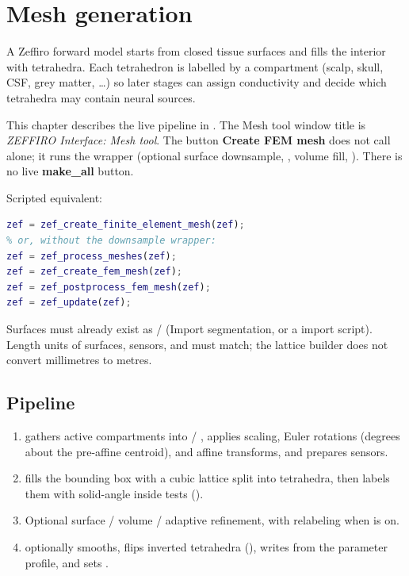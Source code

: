 \section{Mesh generation}\label{sec:mesh-generation}

A Zeffiro forward model starts from closed tissue surfaces and fills the
interior with tetrahedra. Each tetrahedron is labelled by a compartment
(scalp, skull, CSF, grey matter, \ldots) so later stages can assign
conductivity and decide which tetrahedra may contain neural sources.

This chapter describes the live pipeline in . The Mesh tool
window title is \emph{ZEFFIRO Interface: Mesh tool}. The button
\textbf{Create FEM mesh} does not call  alone;
it runs the wrapper 
(optional surface downsample, , volume fill,
). There is no live \textbf{make\_all}
button.

Scripted equivalent:
\begin{lstlisting}[style=unnumberedlines, language=Matlab]
zef = zef_create_finite_element_mesh(zef);
% or, without the downsample wrapper:
zef = zef_process_meshes(zef);
zef = zef_create_fem_mesh(zef);
zef = zef_postprocess_fem_mesh(zef);
zef = zef_update(zef);
\end{lstlisting}

Surfaces must already exist as  /
 (Import segmentation, or a  import
script). Length units of surfaces, sensors, and 
must match; the lattice builder does not convert millimetres to metres.

\subsection{Pipeline}

\begin{enumerate}
\item {} gathers active compartments into
       / , applies scaling, Euler
      rotations (degrees about the pre-affine centroid), and affine
      transforms, and prepares sensors.
\item {} fills the bounding box with a cubic
      lattice split into tetrahedra, then labels them with solid-angle
      inside tests ().
\item Optional surface / volume / adaptive refinement, with relabeling when
       is on.
\item {} optionally smooths, flips inverted
      tetrahedra (), writes  from
      the parameter profile, and sets .
\end{enumerate}

